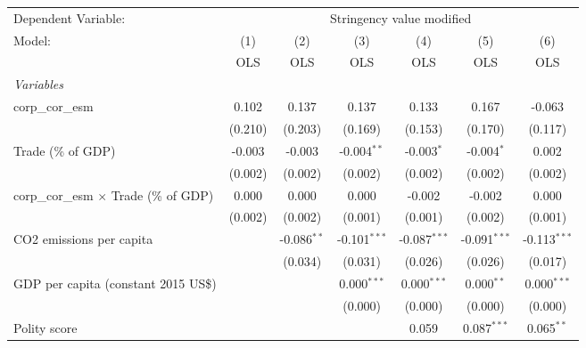 
\begingroup
\centering
\begin{tabular}{lcccccc}
   \toprule
   Dependent Variable: & \multicolumn{6}{c}{Stringency value modified}\\
   Model:                                        & (1)     & (2)           & (3)            & (4)            & (5)            & (6)\\  
                                                 &  OLS    & OLS           & OLS            & OLS            & OLS            & OLS\\  
   \midrule
   \emph{Variables}\\
   corp\_cor\_esm                                & 0.102   & 0.137         & 0.137          & 0.133          & 0.167          & -0.063\\   
                                                 & (0.210) & (0.203)       & (0.169)        & (0.153)        & (0.170)        & (0.117)\\   
   Trade (\% of GDP)                             & -0.003  & -0.003        & -0.004$^{**}$  & -0.003$^{*}$   & -0.004$^{*}$   & 0.002\\   
                                                 & (0.002) & (0.002)       & (0.002)        & (0.002)        & (0.002)        & (0.002)\\   
   corp\_cor\_esm $\times$ Trade (\% of GDP)     & 0.000   & 0.000         & 0.000          & -0.002         & -0.002         & 0.000\\   
                                                 & (0.002) & (0.002)       & (0.001)        & (0.001)        & (0.002)        & (0.001)\\   
   CO2 emissions per capita                      &         & -0.086$^{**}$ & -0.101$^{***}$ & -0.087$^{***}$ & -0.091$^{***}$ & -0.113$^{***}$\\   
                                                 &         & (0.034)       & (0.031)        & (0.026)        & (0.026)        & (0.017)\\   
   GDP per capita (constant 2015 US\$)           &         &               & 0.000$^{***}$  & 0.000$^{***}$  & 0.000$^{**}$   & 0.000$^{***}$\\   
                                                 &         &               & (0.000)        & (0.000)        & (0.000)        & (0.000)\\   
   Polity score                                  &         &               &                & 0.059          & 0.087$^{***}$  & 0.065$^{**}$\\   

\end{tabular}
